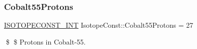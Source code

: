 \subsubsection{\texorpdfstring{Cobalt55\+Protons}{Cobalt55Protons}}
{\footnotesize\ttfamily \mbox{\hyperlink{group___isotope_const-_macros_ga5f18360b3e99483a35c32d789e62621c}{I\+S\+O\+T\+O\+P\+E\+C\+O\+N\+S\+T\+\_\+\+I\+NT}} Isotope\+Const\+::\+Cobalt55\+Protons = 27}

\$ \$ Protons in Cobalt-\/55. 